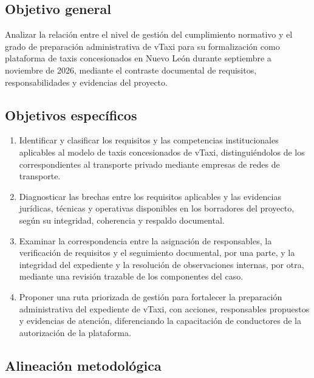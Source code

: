 {\subsection{Objetivo general}

Analizar la relación entre el nivel de gestión del cumplimiento normativo y el grado de preparación administrativa de vTaxi para su formalización como plataforma de taxis concesionados en Nuevo León durante septiembre a noviembre de 2026, mediante el contraste documental de requisitos, responsabilidades y evidencias del proyecto.

\subsection{Objetivos específicos}

\begin{enumerate}

\item Identificar y clasificar los requisitos y las competencias institucionales aplicables al modelo de taxis concesionados de vTaxi, distinguiéndolos de los correspondientes al transporte privado mediante empresas de redes de transporte.

\item Diagnosticar las brechas entre los requisitos aplicables y las evidencias jurídicas, técnicas y operativas disponibles en los borradores del proyecto, según su integridad, coherencia y respaldo documental.

\item Examinar la correspondencia entre la asignación de responsables, la verificación de requisitos y el seguimiento documental, por una parte, y la integridad del expediente y la resolución de observaciones internas, por otra, mediante una revisión trazable de los componentes del caso.

\item Proponer una ruta priorizada de gestión para fortalecer la preparación administrativa del expediente de vTaxi, con acciones, responsables propuestos y evidencias de atención, diferenciando la capacitación de conductores de la autorización de la plataforma.

\end{enumerate}

\subsection{Alineación metodológica}

}
